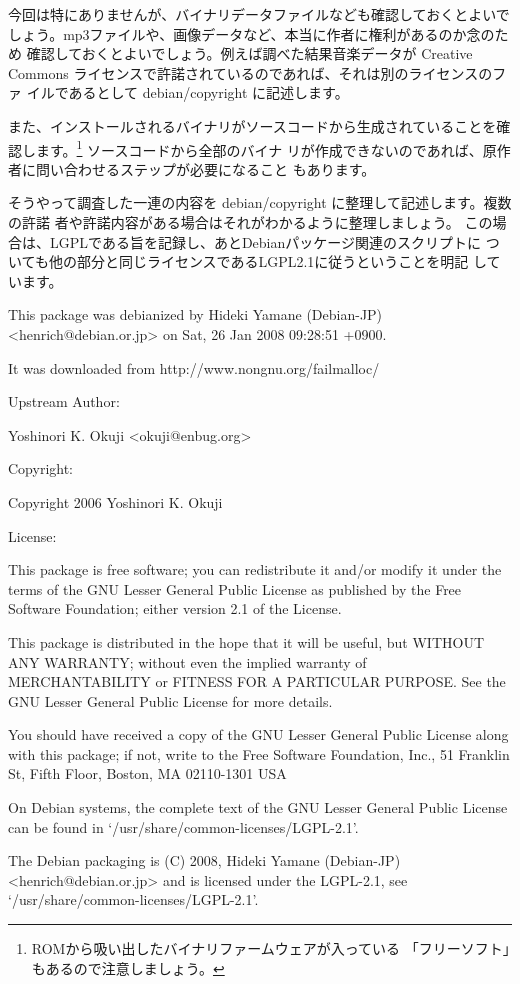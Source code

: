\documentclass[mingoth,a4paper]{jsarticle}
\begin{document}
今回は特にありませんが、バイナリデータファイルなども確認しておくとよいで
しょう。mp3ファイルや、画像データなど、本当に作者に権利があるのか念のため
確認しておくとよいでしょう。例えば調べた結果音楽データが Creative
Commons ライセンスで許諾されているのであれば、それは別のライセンスのファ
イルであるとして debian/copyright に記述します。

また、インストールされるバイナリがソースコードから生成されていることを確
認します。\footnote{ROMから吸い出したバイナリファームウェアが入っている
「フリーソフト」もあるので注意しましょう。} ソースコードから全部のバイナ
リが作成できないのであれば、原作者に問い合わせるステップが必要になること
もあります。

そうやって調査した一連の内容を debian/copyright に整理して記述します。複数の許諾
者や許諾内容がある場合はそれがわかるように整理しましょう。
この場合は、LGPLである旨を記録し、あとDebianパッケージ関連のスクリプトに
ついても他の部分と同じライセンスであるLGPL2.1に従うということを明記
しています。

\begin{commandline}
 This package was debianized by Hideki Yamane (Debian-JP) <henrich@debian.or.jp> on
Sat, 26 Jan 2008 09:28:51 +0900.

It was downloaded from http://www.nongnu.org/failmalloc/

Upstream Author: 

    Yoshinori K. Okuji <okuji@enbug.org>

Copyright: 

    Copyright 2006 Yoshinori K. Okuji

License:

    This package is free software; you can redistribute it and/or
    modify it under the terms of the GNU Lesser General Public
    License as published by the Free Software Foundation; either
    version 2.1 of the License.

    This package is distributed in the hope that it will be useful,
    but WITHOUT ANY WARRANTY; without even the implied warranty of
    MERCHANTABILITY or FITNESS FOR A PARTICULAR PURPOSE.  See the GNU
    Lesser General Public License for more details.

    You should have received a copy of the GNU Lesser General Public
    License along with this package; if not, write to the Free Software
    Foundation, Inc., 51 Franklin St, Fifth Floor, Boston, MA  02110-1301 USA

On Debian systems, the complete text of the GNU Lesser General
Public License can be found in `/usr/share/common-licenses/LGPL-2.1'.

The Debian packaging is (C) 2008, Hideki Yamane (Debian-JP) <henrich@debian.or.jp> and
is licensed under the LGPL-2.1, see `/usr/share/common-licenses/LGPL-2.1'.


\end{commandline}
\end{document}
